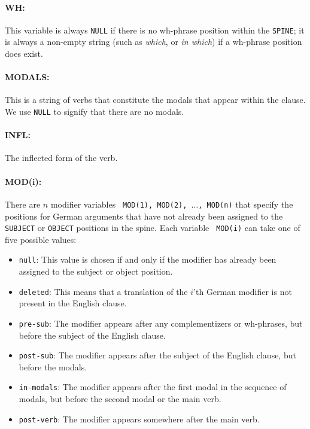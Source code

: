 \documentclass[10pt]{report}
\theoremstyle{plain}
\begin{document}
{\paragraph{WH:} This variable is always {\tt NULL} if there is no
wh-phrase position within the {\tt SPINE}; it is always a
non-empty string (such as {\em which}, or {\em in which}) if a
wh-phrase position does exist.

\paragraph{MODALS:} This is a string of verbs that constitute the
modals that appear within the clause. We use {\tt NULL} to signify
that there are no modals.

\paragraph{INFL:} The inflected form of the verb.

\paragraph{MOD(i):} There are $n$ modifier variables {\tt
  MOD(1), MOD(2), $\ldots$, MOD(n)} that specify the positions for
German arguments that have not already been assigned to the {\tt
SUBJECT} or {\tt OBJECT} positions in the spine. Each variable {\tt
MOD(i)} can take one of five possible values:

\begin{itemize}
\item {\tt null}: This value is chosen if and only if the modifier has
  already been assigned to the subject or object position.
\item {\tt deleted}: This means that a translation of the $i$'th
  German modifier is not present in the English clause.
\item {\tt pre-sub}: The modifier appears after any complementizers or
  wh-phrases, but before the subject of the English clause.
\item {\tt post-sub}: The modifier appears after the subject of the
  English clause, but before the modals.
\item {\tt in-modals}: The modifier appears after the first modal in
  the sequence of modals, but before the second modal or the main
  verb. 
\item {\tt post-verb}: The modifier appears somewhere after the main
  verb. 
\end{itemize}


}
\end{document}
